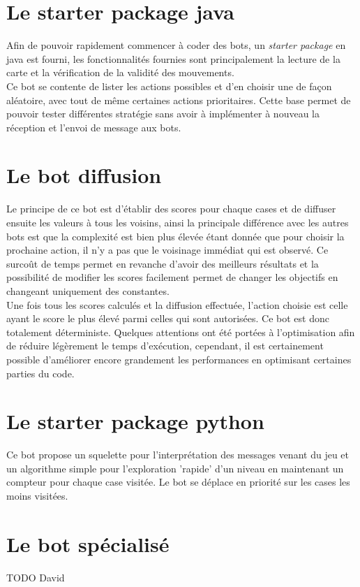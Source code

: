 \documentclass[10pt,a4paper]{report}
\begin{document}
\section{Le starter package java}
Afin de pouvoir rapidement commencer à coder des bots, un \emph{starter package}
en java est fourni, les fonctionnalités fournies sont principalement la lecture
de la carte et la vérification de la validité des mouvements.
\\
Ce bot se contente de lister les actions possibles et d'en choisir une de façon
aléatoire, avec tout de même certaines actions prioritaires. Cette base permet
de pouvoir tester différentes stratégie sans avoir à implémenter à nouveau la
réception et l'envoi de message aux bots.

\section{Le bot diffusion}
Le principe de ce bot est d'établir des scores pour chaque cases et de diffuser
ensuite les valeurs à tous les voisins, ainsi la principale différence avec les
autres bots est que la complexité est bien plus élevée étant donnée que pour
choisir la prochaine action, il n'y a pas que le voisinage immédiat qui est
observé. Ce surcoût de temps permet en revanche d'avoir des meilleurs résultats
et la possibilité de modifier les scores facilement permet de changer les
objectifs en changeant uniquement des constantes.
\\
Une fois tous les scores calculés et la diffusion effectuée, l'action choisie
est celle ayant le score le plus élevé parmi celles qui sont autorisées. Ce bot
est donc totalement déterministe. Quelques attentions ont été portées à
l'optimisation afin de réduire légèrement le temps d'exécution, cependant, il
est certainement possible d'améliorer encore grandement les performances en
optimisant certaines parties du code.

\section{Le starter package python}

Ce bot propose un squelette pour l'interprétation des messages venant du jeu et un algorithme simple pour l'exploration 'rapide' d'un niveau en maintenant un compteur pour chaque case visitée. Le bot se déplace en priorité sur les cases les moins visitées.

\section{Le bot spécialisé}
TODO David
\end{document}
